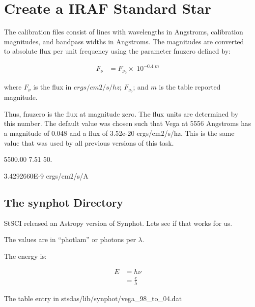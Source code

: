 \section{Create a IRAF Standard Star}

The calibration files consist of lines with wavelengths in Angstroms,
calibration magnitudes, and bandpass widths in Angstroms. The
magnitudes are converted to absolute flux per unit frequency using the
parameter fnuzero defined by:

\begin{subequations}
\begin{align}
F_{\nu} &= F_{\nu_{0}} \times\; 10^{-0.4\; m}
\end{align}
\end{subequations}

where $F_{\nu}$ is the flux in $ergs/cm2/s/hz$; $F_{\nu_{0}}$; and $m$ is the table
reported magnitude. 

Thus, fnuzero is the flux at magnitude zero. The flux units are
determined by this number. The default value was chosen such that Vega
at 5556 Angstroms has a magnitude of 0.048 and a flux of 3.52e-20
ergs/cm2/s/hz. This is the same value that was used by all previous
versions of this task.

5500.00    7.51  50.

3.4292660E-9  ergs/cm2/s/A


\subsection{The synphot Directory}

StSCI released an Astropy version of Synphot. Lets see if that works
for us.


The values are in ``photlam'' or photons per $\lambda$. 

The energy is:

\begin{subequations}
\begin{align}
E &= h\nu \\
  &= \frac{c}{\lambda}
\end{align}
\end{subequations}

The table entry in stsdas/lib/synphot/vega\_98\_to\_04.dat

